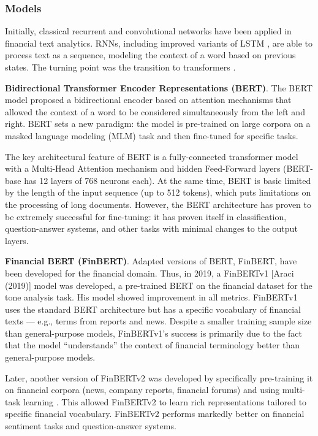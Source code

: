 \subsubsection{Models}

Initially, classical recurrent \parencite{RNN1986} and convolutional \parencite{CNN1998lecun} networks
have been applied in financial text analytics. RNNs, including improved variants of LSTM \parencite{Hochreiter1997LSTM},
are able to process text as a sequence, modeling the context of a word based on previous states. The turning
point was the transition to transformers \parencite{vaswani2017attention}.

\textbf{Bidirectional Transformer Encoder Representations (BERT)}. The BERT model \parencite{devlin2019BERT} proposed
a bidirectional encoder based on attention mechanisms that allowed the context of a word to be considered
simultaneously from the left and right. BERT sets a new paradigm: the model is pre-trained on large corpora
on a masked language modeling (MLM) task and then fine-tuned for specific tasks.

The key architectural feature of BERT is a fully-connected transformer model with a Multi-Head Attention
mechanism and hidden Feed-Forward layers (BERT-base has 12 layers of 768 neurons each). At the same time,
BERT is basic limited by the length of the input sequence (up to 512 tokens), which puts limitations
on the processing of long documents. However, the BERT architecture has proven to be extremely successful
for fine-tuning: it has proven itself in classification, question-answer systems, and other tasks with
minimal changes to the output layers.

\textbf{Financial BERT (FinBERT)}. Adapted versions of BERT, FinBERT, have been developed for the financial
domain. Thus, in 2019, a FinBERTv1 [Araci (2019)] model was developed, a pre-trained BERT on the financial
dataset for the tone analysis task. His model showed improvement in all metrics. FinBERTv1 uses the standard
BERT architecture but has a specific vocabulary of financial texts --- e.g., terms from reports and news.
Despite a smaller training sample size than general-purpose models, FinBERTv1's success is primarily due
to the fact that the model “understands” the context of financial terminology better than general-purpose
models.

Later, another version of FinBERTv2 was developed by specifically pre-training it on financial corpora
(news, company reports, financial forums) and using multi-task learning \parencite{Liu2020FinBERT}. This
allowed FinBERTv2 to learn rich representations tailored to specific financial vocabulary. FinBERTv2
performs markedly better on financial sentiment tasks and question-answer systems.

